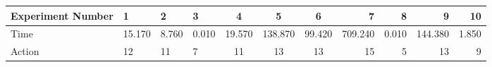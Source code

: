 \documentclass[8pt]{article}
\begin{document}
\begin{landscape}
\begin{tabular}{ | l | l | l | l | c | c | c | r | r | r | r | }
 \hline 
Experiment Number & 1 & 2 & 3 & 4 & 5 & 6 & 7 & 8 & 9 & 10\\ \hline
Time & 15.170 & 8.760 & 0.010 & 19.570 & 138.870 & 99.420 & 709.240 & 0.010 & 144.380 & 1.850\\ \hline
Action & 12 & 11 & 7 & 11 & 13 & 13 & 15 & 5 & 13 & 9\\ \hline\end{tabular}
\end{landscape}
\end{document}
